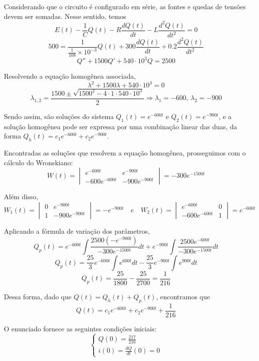 \documentclass[oneside,12pt,a4paper]{report}
\begin{document}
\begin{resolucao}
    Considerando que o circuito é configurado em série, as fontes e quedas de tensões devem ser somadas. Nesse sentido, temos
    \[E(t)-\frac{1}{C}Q(t)-R\frac{dQ(t)}{dt}-L\frac{d^2Q(t)}{dt^2}=0\]
    \[500=\frac{1}{\frac{1}{108}\times10^{-3}}Q(t)+300\frac{dQ(t)}{dt}+0.2\frac{d^2Q(t)}{dt^2}\]
    \[Q''+1500Q'+540\cdot10^3Q=2500\]

    Resolvendo a equação homogênea associada,
    \[\lambda^2+1500\lambda+540\cdot10^3=0\]
    \[\lambda_{1,2}=\frac{1500\pm\sqrt{1500^2-4\cdot1\cdot540\cdot10^3}}{2}\Rightarrow\lambda_1=-600,~\lambda_2=-900\]

    Sendo assim, são soluções do sistema $Q_1(t)=e^{-600t}$ e $Q_2(t)=e^{-900t}$, e a solução homogênea pode ser expressa por uma combinação linear das duas, da forma $Q_h(t)=c_1e^{-600t}+c_2e^{-900t}$.

    Encontradas as soluções que resolvem a equação homogênea, prosseguimos com o cálculo do Wronskiano:
    \[W(t)=\begin{vmatrix}
        e^{-600t}          & e^{-900t}\\
        -600e^{-600t} & -900e^{-900t}
    \end{vmatrix}=-300e^{-1500t}\]

    Além disso,
    \[W_1(t)=\begin{vmatrix}
        0 & e^{-900t}\\
        1 & -900e^{-900t}
    \end{vmatrix}=-e^{-900t}\quad e \quad W_2(t)=\begin{vmatrix}
        e^{-600t} & 0\\
        -600e^{-600t} & 1
    \end{vmatrix}=e^{-600t}\]

    Aplicando a fórmula de variação dos parâmetros, 
    \[Q_p(t)=e^{-600t}\int\frac{2500(-e^{-900t})}{-300e^{-1500t}}dt+e^{-900t}\int\frac{2500e^{-600t}}{-300e^{-1500t}}dt\]
    \[Q_p(t)=\frac{25}{3}e^{-600t}\int e^{600t}dt-\frac{25}{3}e^{-900t}\int e^{900t}dt\]
    \[Q_p(t)=\frac{25}{1800}-\frac{25}{2700}=\frac{1}{216}\]

    Dessa forma, dado que $Q(t)=Q_h(t)+Q_p(t)$, encontramos que
    \[Q(t)=c_1e^{-600t}+c_2e^{-900t}+\frac{1}{216}\]

    O enunciado fornece as seguintes condições iniciais:
    \[\begin{cases}
        \displaystyle Q(0)=\frac{217}{216}\\
        \displaystyle i(0)=\frac{dQ}{dt}(0)=0
    \end{cases}\]


\end{resolucao}
\end{document}
